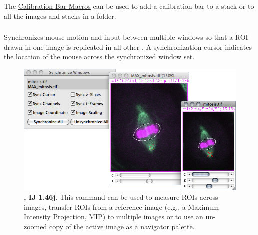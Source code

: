The \href{http://imagej.nih.gov/ij/macros/CalibrationBarMacros.txt}{Calibration Bar Macros}
can be used to add a calibration bar to a stack or to all the images
and stacks in a folder.




\subsubsection[\protect\userinterface{Synchronize Windows}]{\protect{}\label{sub:SynchronizeWindows}}

Synchronizes mouse motion and input
between multiple windows so that a ROI drawn in one image is replicated
in all other  \cite{C-SyncWIndows}. A synchronization
cursor indicates the location of the mouse across the synchronized
window set.
\begin{figure}[h]
\noindent \includegraphics[scale=0.55]{images/SyncWindows}\caption[Synchronized windows]{\label{fig:SyncWindows}\textbf{\protect{},
IJ 1.46j}. This command can be used to measure ROIs across images,
transfer ROIs from a reference image (e.g., a Maximum Intensity Projection,
MIP) to multiple images or to use an un-zoomed copy of the active
image as a navigator palette.}
\end{figure}

